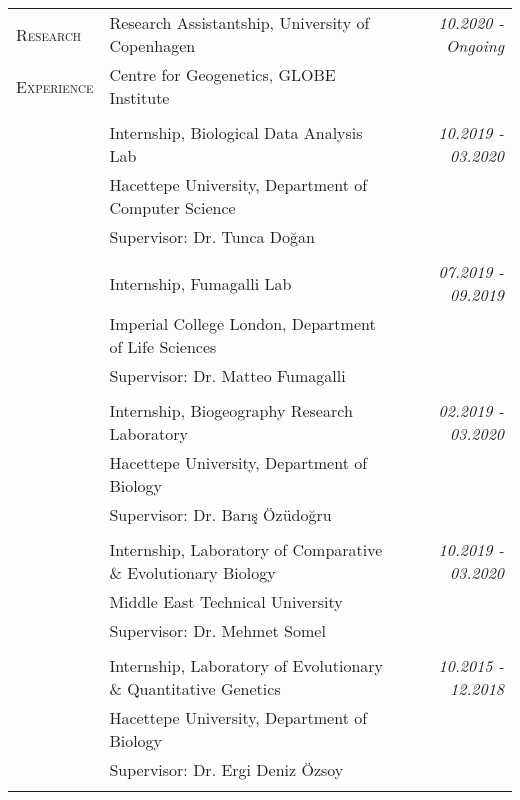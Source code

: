 \documentclass[letterpaper,11pt]{article}
\begin{document}
\noindent \begin{tabular}{@{} l l r}
 \textsc{Research}
 & Research Assistantship, University of Copenhagen
 & \textit{10.2020 - Ongoing} \\
 \textsc{Experience}
  & Centre for Geogenetics, GLOBE Institute \\
     & \\
  & Internship, Biological Data Analysis Lab
   & \textit{10.2019 - 03.2020} \\
  & Hacettepe University, Department of Computer Science \\
  & Supervisor: Dr. Tunca Do\u{g}an\\
     & \\
  & Internship, Fumagalli Lab
   & \textit{07.2019 - 09.2019} \\
  & Imperial College London, Department of Life Sciences \\
  & Supervisor: Dr. Matteo Fumagalli\\

     & \\
  & Internship, Biogeography Research Laboratory
   & \textit{02.2019 - 03.2020} \\
  & Hacettepe University, Department of Biology \\
  & Supervisor: Dr. Bar{\i}\c{s} \"{O}z\"{u}do\u{g}ru\\

     & \\
  & Internship, Laboratory of Comparative \& Evolutionary Biology
   & \textit{10.2019 - 03.2020} \\
  & Middle East Technical University\\
  & Supervisor: Dr. Mehmet Somel\\
  
     & \\
  & Internship, Laboratory of Evolutionary \& Quantitative Genetics
   & \textit{10.2015 - 12.2018} \\
  & Hacettepe University, Department of Biology \\
  & Supervisor: Dr. Ergi Deniz \"{O}zsoy\\
     & \\
\end{tabular}


\end{document}
